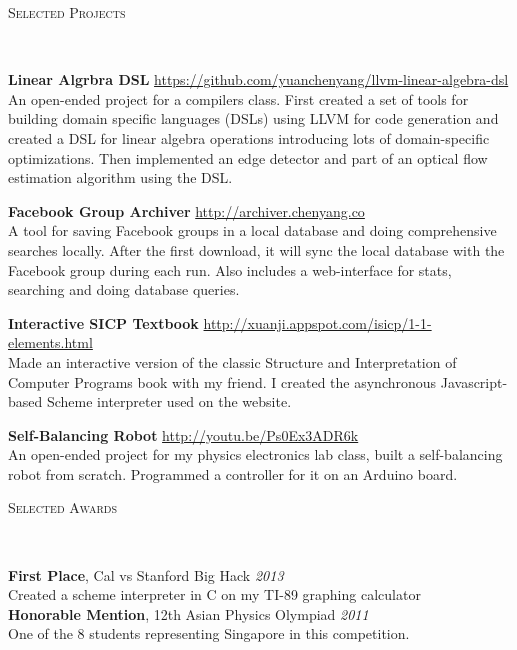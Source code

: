 \documentclass[9pt]{article}
\newenvironment{changemargin}[2]{%
  \begin{list}{}{%
      \setlength{\topsep}{0pt}%
      \setlength{\leftmargin}{#1}%
      \setlength{\rightmargin}{#2}%
      \setlength{\listparindent}{\parindent}%
      \setlength{\itemindent}{\parindent}%
      \setlength{\parsep}{\parskip}%
    }%
  \item[]}{\end{list}
}
\newcommand{\lineover}{
  \begin{changemargin}{-0.05in}{-0.05in}
    \vspace*{-8pt}
    \hrulefill \\
    \vspace*{-2pt}
  \end{changemargin}
}
\newcommand{\header}[1]{
  \begin{changemargin}{-0.5in}{-0.5in}
    \scshape{#1}\\
    \lineover
  \end{changemargin}
}
\newenvironment{body} {
  \vspace*{-16pt}
  \begin{changemargin}{-0.25in}{-0.5in}
  }
  {\end{changemargin}
}
\begin{document}
\smallskip

\header{Selected Projects}

\begin{body}
  \vspace{14pt}

  \textbf{Linear Algrbra DSL} \hfill \url{https://github.com/yuanchenyang/llvm-linear-algebra-dsl} \\
  An open-ended project for a compilers class. First created a set of tools for
  building domain specific languages (DSLs) using LLVM for code generation and
  created a DSL for linear algebra operations introducing lots of
  domain-specific optimizations. Then implemented an edge detector and part of
  an optical flow estimation algorithm using the DSL.
  \medskip

  \textbf{Facebook Group Archiver} \hfill \url{http://archiver.chenyang.co}\\
  A tool for saving Facebook groups in a local database and doing comprehensive
  searches locally. After the first download, it will sync the local database
  with the Facebook group during each run. Also includes a web-interface for
  stats, searching and doing database queries. \\
  \medskip

  \textbf{Interactive SICP Textbook} \hfill
  \url{http://xuanji.appspot.com/isicp/1-1-elements.html}\\
  Made an interactive version of the classic Structure and Interpretation of
  Computer Programs book with my friend. I created the asynchronous
  Javascript-based Scheme interpreter used on the website. \\
  \medskip

  \textbf{Self-Balancing Robot} \hfill \url{http://youtu.be/Ps0Ex3ADR6k} \\
  An open-ended project for my physics electronics lab class, built a
  self-balancing robot from scratch. Programmed a controller for it on an
  Arduino board. \\
  \medskip

\end{body}

\smallskip


\header{Selected Awards}
\begin{body}
  \vspace{14pt}
  \textbf{First Place}, Cal vs Stanford Big Hack \hfill{} \emph{2013}\\
  Created a scheme interpreter in C on my TI-89 graphing calculator \\
  \textbf{Honorable Mention}, 12th Asian Physics Olympiad \hfill{} \emph{2011}\\
  One of the 8 students representing Singapore in this competition.\\
\end{body}
\end{document}

